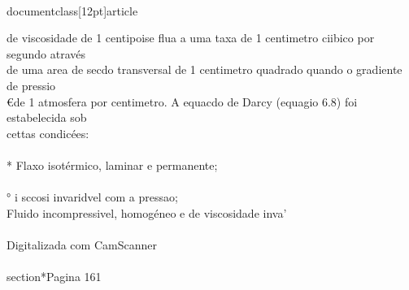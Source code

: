 \\documentclass[12pt]{article}
\begin{document}
de viscosidade de 1 centipoise flua a uma taxa de 1 centimetro ciibico por segundo através\\
de uma area de secdo transversal de 1 centimetro quadrado quando o gradiente de pressio\\
€de 1 atmosfera por centimetro. A equacdo de Darcy (equagio 6.8) foi estabelecida sob\\
cettas condicées:\\
\\
* Flaxo isotérmico, laminar e permanente;\\
\\
° i sccosi invaridvel com a pressao;\\
Fluido incompressivel, homogéneo e de viscosidade inva'\\
\\
Digitalizada com CamScanner\\

\\section*{Pagina 161}
\end{document}
